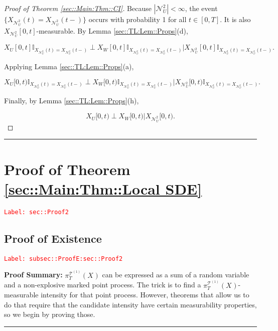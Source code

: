 \documentclass[12pt]{article}
\newcommand{\mb}{\mathbb}
\newcommand{\mc}{\mathcal}
\newcommand{\tr}{\textcolor{red}}
\newcommand{\labe}[1]{\tr{\texttt{Label: #1}}}
\newcommand{\pfsum}{\textbf{Proof Summary: }}
\newcommand{\lin}{\rule{\linewidth}{0.4 pt}}
\renewcommand{\U}{U}							%
\newcommand{\UU}{W}								%
\newcommand{\T}{T}								%
\renewcommand{\t}{t}							%
\newcommand{\proj}{\pi}							%
\newcommand{\X}{X}								%
\newcommand{\dneigh}{\mc{N}^2}					%
\newcommand{\vsi}[1]{^{#1}}						%
\newcommand{\cind}[1]{_{#1}}					%
\newcommand{\tp}[1]{(#1)}						%
\newcommand{\tip}[1]{#1}						%
\newcommand{\ts}[1]{_{#1}}						%
\newcommand{\tree}{\mc{T}}						%
\newcommand{\sln}[1]{^{(#1)}}					%
\newcommand{\dnvind}[1]{_{#1}}					%
\begin{document}
\begin{proof}[Proof of Theorem \ref{sec::Main:Thm::CI}]
Because \(|\dneigh\dnvind{\U}| < \infty\), the event \(\{\X\cind{\dneigh\dnvind{\U}}\tp{\t} = \X\cind{\dneigh\dnvind{\U}}\tp{\t-}\}\) occurs with probability 1 for all \(\t \in [0,\T]\). It is also \(\X\cind{\dneigh\dnvind{\U}}\tip{[0,\t]}\)-measurable. By Lemma \ref{sec::TL:Lem::Props}(d),

\[\X\cind{\U}\tip{[0,\t]}\mb{I}_{\X\cind{\dneigh\dnvind{\U}}\tp{\t} = \X\cind{\dneigh\dnvind{\U}}\tp{\t-}}\perp\X\cind{\UU}\tip{[0,\t]}\mb{I}_{\X\cind{\dneigh\dnvind{\U}}\tp{\t} = \X\cind{\dneigh\dnvind{\U}}\tp{\t-}}\big|\X\cind{\dneigh\dnvind{\U}}\tip{[0,\t]}\mb{I}_{\X\cind{\dneigh\dnvind{\U}}\tp{\t} = \X\cind{\dneigh\dnvind{\U}}\tp{\t-}}.\]

Applying Lemma \ref{sec::TL:Lem::Props}(a),

\[\X\cind{\U}\tip{[0,\t)}\mb{I}_{\X\cind{\dneigh\dnvind{\U}}\tp{\t} = \X\cind{\dneigh\dnvind{\U}}\tp{\t-}}\perp\X\cind{\UU}\tip{[0,\t)}\mb{I}_{\X\cind{\dneigh\dnvind{\U}}\tp{\t} = \X\cind{\dneigh\dnvind{\U}}\tp{\t-}}\big|\X\cind{\dneigh\dnvind{\U}}\tip{[0,\t)}\mb{I}_{\X\cind{\dneigh\dnvind{\U}}\tp{\t} = \X\cind{\dneigh\dnvind{\U}}\tp{\t-}}.\]

Finally, by Lemma \ref{sec::TL:Lem::Props}(h),

\[\X\cind{\U}\tip{[0,\t)}\perp\X\cind{\UU}\tip{[0,\t)}\big|\X\cind{\dneigh\dnvind{\U}}\tip{[0,\t)}.\]
\end{proof}

\lin

\section{Proof of Theorem \ref{sec::Main:Thm::Local SDE}}
\label{sec::Proof2}\labe{sec::Proof2}

\subsection{Proof of Existence}
\label{subsec::ProofE:sec::Proof2}\labe{subsec::ProofE:sec::Proof2}

\pfsum \(\proj\vsi{\tree\sln{1}}\ts{\T}(\X\cind{}\tip{})\) can be expressed as a sum of a random variable and a non-explosive marked point process. The trick is to find a \(\proj\vsi{\tree\sln{1}}\ts{\T}(\X\cind{}\tip{})\)-measurable intensity for that point process. However, theorems that allow us to do that require that the candidate intensity have certain measurability properties, so we begin by proving those.

\lin
\end{document}
